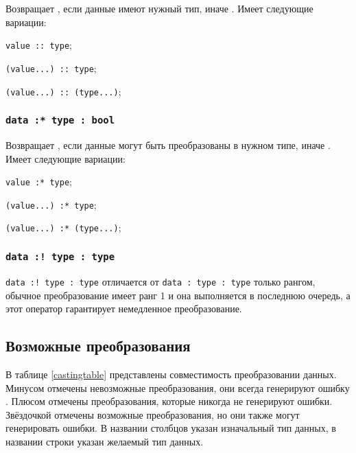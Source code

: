Возвращает \true, если данные имеют нужный тип, иначе \false. Имеет следующие вариации:
\begin{icItems}
	\item \lstinline|value :: type|;
	\item \lstinline|(value...) :: type|;
	\item \lstinline|(value...) :: (type...)|;
\end{icItems}

\subsubsection{\lstinline|data :* type : bool|}

Возвращает \true, если данные могут быть преобразованы в нужном типе, иначе \false. Имеет следующие вариации:
\begin{icItems}
	\item \lstinline|value :* type|;
	\item \lstinline|(value...) :* type|;
	\item \lstinline|(value...) :* (type...)|;
\end{icItems}

\subsubsection{\lstinline|data :! type : type|}

\lstinline|data :! type : type| отличается от \lstinline|data : type : type| только рангом, обычное преобразование имеет ранг 1 и она выполняется в последнюю очередь, а этот оператор гарантирует немедленное преобразование.

\subsection{Возможные преобразования}

В таблице \ref{castingtable} представлены совместимость преобразовании данных. Минусом отмечены невозможные преобразования, они всегда генерируют ошибку . Плюсом отмечены преобразования, которые никогда не генерируют ошибки. Звёздочкой отмечены возможные преобразования, но они также могут генерировать ошибки. В названии столбцов указан изначальный тип данных, в названии строки указан желаемый тип данных.

